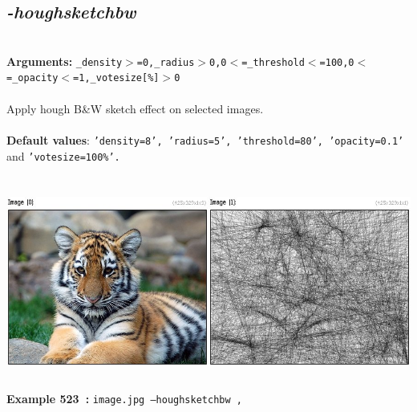 \documentclass[a4paper,11pt,twoside]{book}
\begin{document}
\subsection{\emph{-houghsketchbw} }\vspace*{-0.5em}
~\\\textbf{Arguments: } 
{\small \texttt{\_density$>$=0,\_radius$>$0,0$<$=\_threshold$<$=100,0$<$=\_opacity$<$=1,\_votesize[\%]$>$0}}\\~\\
Apply hough B\&W sketch effect on selected images.
~\\~\\\textbf{Default values}: {\small \texttt{'density=8', 'radius=5', 'threshold=80', 'opacity=0.1'} and \texttt{'votesize=100\%'.}}
\begin{center}\includegraphics[keepaspectratio=true,height=7cm,width=\textwidth]{img/gmic_def523.jpg}\\
{\footnotesize \textbf{Example 523~:} \texttt{image.jpg --houghsketchbw ,}}
\end{center}
\end{document}
